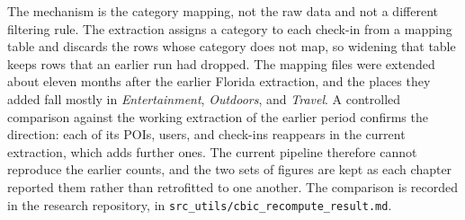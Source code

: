 The mechanism is the category mapping, not the raw data and not a different filtering
rule. The extraction assigns a category to each check-in from a mapping table and
discards the rows whose category does not map, so widening that table keeps rows that an
earlier run had dropped. The mapping files were extended about eleven months after the
earlier Florida extraction, and the places they added fall mostly in
\emph{Entertainment}, \emph{Outdoors}, and \emph{Travel}. A controlled comparison against
the working extraction of the earlier period confirms the direction: each of its POIs,
users, and check-ins reappears in the current extraction, which adds further ones. The
current pipeline therefore cannot reproduce the earlier counts, and the two sets of
figures are kept as each chapter reported them rather than retrofitted to one another.
The comparison is recorded in the research repository, in
\texttt{src\_utils/cbic\_recompute\_result.md}.

